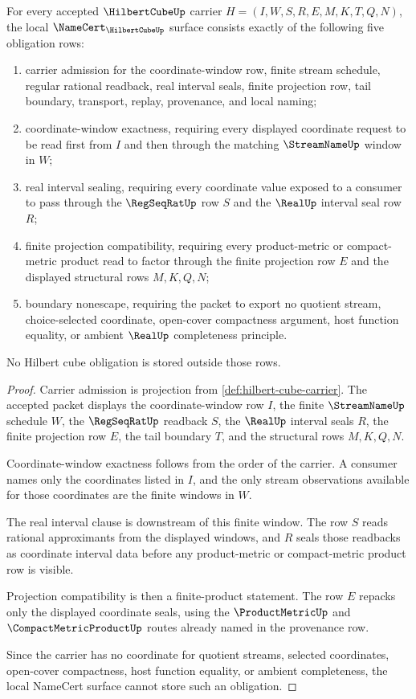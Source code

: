 \begin{theorem}
\label{thm:hilbert-cube-namecert-obligations}
For every accepted $\HilbertCubeUp$ carrier $H=(I,W,S,R,E,M,K,T,Q,N)$, the local $\NameCert_{\HilbertCubeUp}$ surface consists exactly of the following five obligation rows:
\begin{enumerate}
\item carrier admission for the coordinate-window row, finite stream schedule, regular rational readback, real interval seals, finite projection row, tail boundary, transport, replay, provenance, and local naming;
\item coordinate-window exactness, requiring every displayed coordinate request to be read first from $I$ and then through the matching $\StreamNameUp$ window in $W$;
\item real interval sealing, requiring every coordinate value exposed to a consumer to pass through the $\RegSeqRatUp$ row $S$ and the $\RealUp$ interval seal row $R$;
\item finite projection compatibility, requiring every product-metric or compact-metric product read to factor through the finite projection row $E$ and the displayed structural rows $M,K,Q,N$;
\item boundary nonescape, requiring the packet to export no quotient stream, choice-selected coordinate, open-cover compactness argument, host function equality, or ambient $\RealUp$ completeness principle.
\end{enumerate}
No Hilbert cube obligation is stored outside those rows.
\end{theorem}
\begin{proof}
Carrier admission is projection from \autoref{def:hilbert-cube-carrier}. The accepted packet displays the coordinate-window row $I$, the finite $\StreamNameUp$ schedule $W$, the $\RegSeqRatUp$ readback $S$, the $\RealUp$ interval seals $R$, the finite projection row $E$, the tail boundary $T$, and the structural rows $M,K,Q,N$.

Coordinate-window exactness follows from the order of the carrier. A consumer names only the coordinates listed in $I$, and the only stream observations available for those coordinates are the finite windows in $W$.

The real interval clause is downstream of this finite window. The row $S$ reads rational approximants from the displayed windows, and $R$ seals those readbacks as coordinate interval data before any product-metric or compact-metric product row is visible.

Projection compatibility is then a finite-product statement. The row $E$ repacks only the displayed coordinate seals, using the $\ProductMetricUp$ and $\CompactMetricProductUp$ routes already named in the provenance row.

Since the carrier has no coordinate for quotient streams, selected coordinates, open-cover compactness, host function equality, or ambient completeness, the local NameCert surface cannot store such an obligation.
\end{proof}

